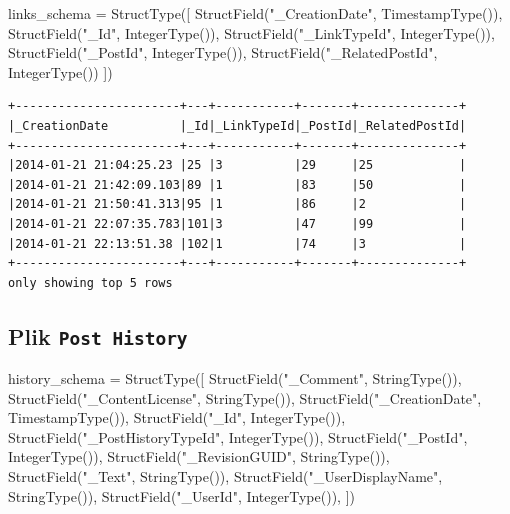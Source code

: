 \documentclass[
  letterpaper,
  DIV=11,
  numbers=noendperiod]{scrreprt}
\newenvironment{Shaded}{\begin{snugshade}}{\end{snugshade}}
\newcommand{\NormalTok}[1]{\textcolor[rgb]{0.00,0.23,0.31}{#1}}
\newcommand{\OperatorTok}[1]{\textcolor[rgb]{0.37,0.37,0.37}{#1}}
\newcommand{\StringTok}[1]{\textcolor[rgb]{0.13,0.47,0.30}{#1}}
\begin{document}
\begin{Shaded}
\begin{Highlighting}[]
\NormalTok{links\_schema }\OperatorTok{=}\NormalTok{ StructType([}
\NormalTok{    StructField(}\StringTok{"\_CreationDate"}\NormalTok{, TimestampType()),}
\NormalTok{    StructField(}\StringTok{"\_Id"}\NormalTok{, IntegerType()),}
\NormalTok{    StructField(}\StringTok{"\_LinkTypeId"}\NormalTok{, IntegerType()),}
\NormalTok{    StructField(}\StringTok{"\_PostId"}\NormalTok{, IntegerType()),}
\NormalTok{    StructField(}\StringTok{"\_RelatedPostId"}\NormalTok{, IntegerType())}
\NormalTok{])}
\end{Highlighting}
\end{Shaded}

\begin{verbatim}
+-----------------------+---+-----------+-------+--------------+
|_CreationDate          |_Id|_LinkTypeId|_PostId|_RelatedPostId|
+-----------------------+---+-----------+-------+--------------+
|2014-01-21 21:04:25.23 |25 |3          |29     |25            |
|2014-01-21 21:42:09.103|89 |1          |83     |50            |
|2014-01-21 21:50:41.313|95 |1          |86     |2             |
|2014-01-21 22:07:35.783|101|3          |47     |99            |
|2014-01-21 22:13:51.38 |102|1          |74     |3             |
+-----------------------+---+-----------+-------+--------------+
only showing top 5 rows
\end{verbatim}

\normalsize

\hypertarget{plik-post-history}{%
\subsection{\texorpdfstring{Plik
\texttt{Post\ History}}{Plik Post History}}\label{plik-post-history}}

\small

\begin{Shaded}
\begin{Highlighting}[]
\NormalTok{history\_schema }\OperatorTok{=}\NormalTok{ StructType([}
\NormalTok{    StructField(}\StringTok{"\_Comment"}\NormalTok{, StringType()),}
\NormalTok{    StructField(}\StringTok{"\_ContentLicense"}\NormalTok{, StringType()),}
\NormalTok{    StructField(}\StringTok{"\_CreationDate"}\NormalTok{, TimestampType()),}
\NormalTok{    StructField(}\StringTok{"\_Id"}\NormalTok{, IntegerType()),}
\NormalTok{    StructField(}\StringTok{"\_PostHistoryTypeId"}\NormalTok{, IntegerType()),}
\NormalTok{    StructField(}\StringTok{"\_PostId"}\NormalTok{, IntegerType()),}
\NormalTok{    StructField(}\StringTok{"\_RevisionGUID"}\NormalTok{, StringType()),}
\NormalTok{    StructField(}\StringTok{"\_Text"}\NormalTok{, StringType()),}
\NormalTok{    StructField(}\StringTok{"\_UserDisplayName"}\NormalTok{, StringType()),}
\NormalTok{    StructField(}\StringTok{"\_UserId"}\NormalTok{, IntegerType()),}
\NormalTok{])}
\end{Highlighting}
\end{Shaded}
\end{document}
